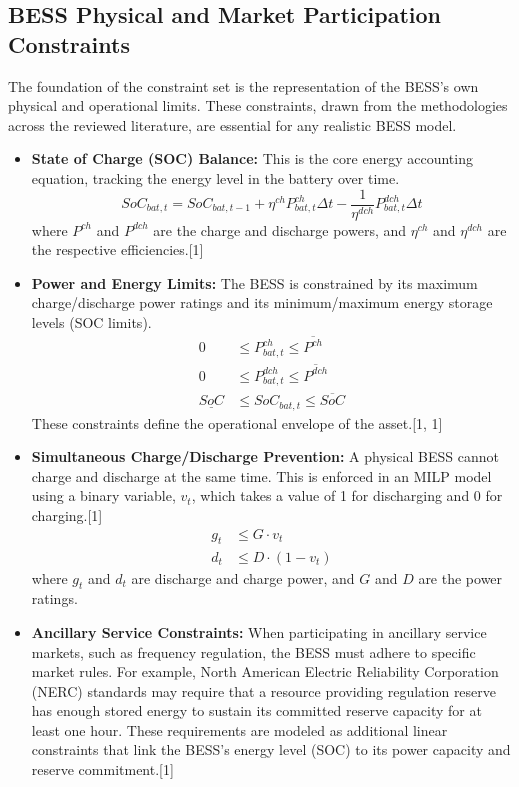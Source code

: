 \subsection{BESS Physical and Market Participation Constraints}

The foundation of the constraint set is the representation of the BESS's own physical and operational limits. These constraints, drawn from the methodologies across the reviewed literature, are essential for any realistic BESS model.

\begin{itemize}
    \item \textbf{State of Charge (SOC) Balance:} This is the core energy accounting equation, tracking the energy level in the battery over time.
    \begin{equation}
    SoC_{bat,t} = SoC_{bat,t-1} + \eta^{ch}P_{bat,t}^{ch}\Delta t - \frac{1}{\eta^{dch}}P_{bat,t}^{dch}\Delta t
    \end{equation}
    where $P^{ch}$ and $P^{dch}$ are the charge and discharge powers, and $\eta^{ch}$ and $\eta^{dch}$ are the respective efficiencies.[1]

    \item \textbf{Power and Energy Limits:} The BESS is constrained by its maximum charge/discharge power ratings and its minimum/maximum energy storage levels (SOC limits).
    \begin{align*}
    0 &\le P_{bat,t}^{ch} \le \overline{P^{ch}} \\
    0 &\le P_{bat,t}^{dch} \le \overline{P^{dch}} \\
    \underline{SoC} &\le SoC_{bat,t} \le \overline{SoC}
    \end{align*}
    These constraints define the operational envelope of the asset.[1, 1]

    \item \textbf{Simultaneous Charge/Discharge Prevention:} A physical BESS cannot charge and discharge at the same time. This is enforced in an MILP model using a binary variable, $v_t$, which takes a value of 1 for discharging and 0 for charging.[1]
    \begin{align*}
    g_t &\le G \cdot v_t \\
    d_t &\le D \cdot (1-v_t)
    \end{align*}
    where $g_t$ and $d_t$ are discharge and charge power, and $G$ and $D$ are the power ratings.

    \item \textbf{Ancillary Service Constraints:} When participating in ancillary service markets, such as frequency regulation, the BESS must adhere to specific market rules. For example, North American Electric Reliability Corporation (NERC) standards may require that a resource providing regulation reserve has enough stored energy to sustain its committed reserve capacity for at least one hour. These requirements are modeled as additional linear constraints that link the BESS's energy level (SOC) to its power capacity and reserve commitment.[1]
\end{itemize}

